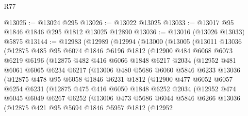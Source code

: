 \begin{lexlean}{R77}
\begin{coremodule}
@13025 := @13024 @295
@13026 := @13022 @13025
@13033 := @13017 @95 @1846 @1846 @295 @1812 @13025 @12890
@13036 := @13016 (@13026 @13033) @5875
@13144 := @12983
    (@12989
      (@12994
        (@13000
          (@13005
            (@13011
              @13036
              (@12875
                @485
                @95
                @6074
                @1846
                @6196
                @1812
                (@12900
                  @484
                  @6068
                  @6073
                  @6219
                  @6196
                  (@12875
                    @482
                    @416
                    @6066
                    @1848
                    @6217
                    @2034
                    (@12952
                      @481
                      @6061
                      @6065
                      @6234
                      @6217
                      (@13006
                        @480
                        @5686
                        @6060
                        @5846
                        @6233
                        @13036
                        (@12875
                          @478
                          @95
                          @6058
                          @1846
                          @6231
                          @1812
                          (@12900
                            @477
                            @6052
                            @6057
                            @6254
                            @6231
                            (@12875
                              @475
                              @416
                              @6050
                              @1848
                              @6252
                              @2034
                              (@12952
                                @474
                                @6045
                                @6049
                                @6267
                                @6252
                                (@13006
                                  @473
                                  @5686
                                  @6044
                                  @5846
                                  @6266
                                  @13036
                                  (@12875
                                    @421
                                    @95
                                    @5694
                                    @1846
                                    @5957
                                    @1812
                                    (@12952

\end{coremodule}
\end{lexlean}
